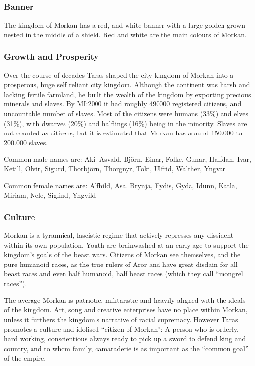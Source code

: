 \subsubsection{Banner}

The kingdom of Morkan has a red, and white banner with a large golden grown
nested in the middle of a shield. Red and white are the main colours of
Morkan.

\subsubsection{Growth and Prosperity}

Over the course of decades Taras shaped the city kingdom of Morkan into a
prosperous, huge self reliant city kingdom. Although the continent was harsh
and lacking fertile farmland, he built the wealth of the kingdom by exporting
precious minerals and slaves. By MI:2000 it had roughly 490000 registered
citizens, and uncountable number of slaves. Most of the citizens were humans
(33\%) and elves (31\%), with dwarves (20\%) and halflings (16\%) being in the
minority. Slaves are not counted as citizens, but it is estimated that Morkan
has around 150.000 to 200.000 slaves.

Common male names are: Aki, Asvald, Björn, Einar, Folke, Gunar, Halfdan, Ivar,
Ketill, Olvir, Sigurd, Thorbjörn, Thorgnyr, Toki, Ulfrid, Walther, Yngvar

Common female names are: Alfhild, Asa, Brynja, Eydis, Gyda, Idunn, Katla,
Miriam, Nele, Siglind, Yngvild

\subsubsection{Culture}

Morkan is a tyrannical, fascistic regime that actively represses any dissident
within its own population. Youth are brainwashed at an early age to support
the kingdom's goals of the beast wars. Citizens of Morkan see themselves, and
the pure humanoid races, as the true rulers of Aror and have great disdain for
all beast races and even half humanoid, half beast races (which they call
``mongrel races'').

The average Morkan is patriotic, militaristic and heavily aligned with the
ideals of the kingdom. Art, song and creative enterprises have no place within
Morkan, unless it furthers the kingdom's narrative of racial supremacy. However
Taras promotes a culture and idolised ``citizen of Morkan'': A person who is
orderly, hard working, conscientious always ready to pick up a sword to defend
king and country, and to whom family, camaraderie is as important as the
``common goal'' of the empire.

